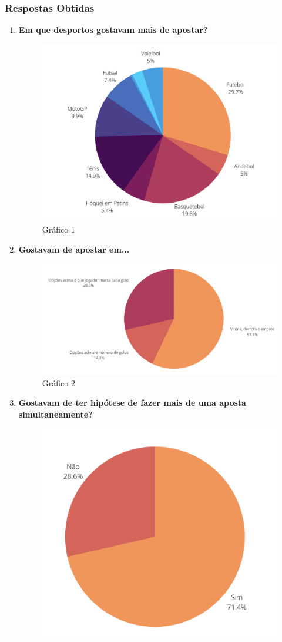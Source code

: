 \newpage
\subsubsection{Respostas Obtidas}
\vspace{5mm}
\begin{enumerate}
    \item \textbf{Em que desportos gostavam mais de apostar?}
        \begin{figure}[!htb]
            \centering
            \includegraphics[width=.65\linewidth]{imagens/levantamentoRequisitos/Grafico1.png}
            \caption{Gráfico 1 }
        \end{figure}
    \vspace{20mm}
    \item \textbf{Gostavam de apostar em...}
        \begin{figure}[!htb]
            \centering
            \includegraphics[width=.90\linewidth]{imagens/levantamentoRequisitos/Grafico2.png}
            \caption{Gráfico 2 }
        \end{figure}
        \newpage
    \item \textbf{Gostavam de ter hipótese de fazer mais de uma aposta simultaneamente?}
        \begin{figure}[!htb]
            \centering
            \includegraphics[width=.50\linewidth]{imagens/levantamentoRequisitos/Grafico3.png}

\end{figure}
\end{enumerate}
